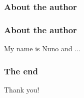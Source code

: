 \documentclass{beamer}
\begin{document}
\begin{frame}
\frametitle{About the author}

\end{frame}

\begin{frame}
\frametitle{About the author}
My name is Nuno and ...
\end{frame}

\begin{frame}
\frametitle{The end}
Thank you!
\end{frame}
\end{document}
